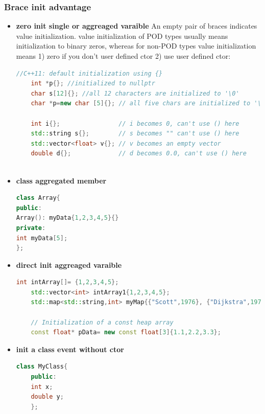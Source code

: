 \documentclass[a4paper,12pt,twoside]{book}
\begin{document}
\subsubsection{Brace init advantage}
\begin{itemize}
	
	\item \textbf{zero init single or aggreaged varaible} An empty pair of braces indicates value initialization. value initialization of POD types usually means initialization to binary zeros, whereas for non-POD types value initialization means 1) zero if you don't user defined ctor 2) use user defined ctor:
	
	\begin{lstlisting}[frame=single, language=c++,mathescape=true]
	//C++11: default initialization using {}
	int *p{}; //initialized to nullptr
	char s[12]{}; //all 12 characters are initialized to '\0'
	char *p=new char [5]{}; // all five chars are initialized to '\0'
	
	int i{};                // i becomes 0, can't use () here
	std::string s{};        // s becomes "" can't use () here
	std::vector<float> v{}; // v becomes an empty vector
	double d{};             // d becomes 0.0, can't use () here
	
	\end{lstlisting}
	
	\item \textbf{class aggregated member}

\begin{lstlisting}[frame=single, language=c++,mathescape=true]
	class Array{
public:
Array(): myData{1,2,3,4,5}{}    
private:
int myData[5];
};
\end{lstlisting}

\item \textbf{direct init aggreaged varaible}
\begin{lstlisting}[frame=single, language=c++,mathescape=true]
	int intArray[]= {1,2,3,4,5};   
	std::vector<int> intArray1{1,2,3,4,5};  
	std::map<std::string,int> myMap{{"Scott",1976}, {"Dijkstra",1972}};
	
	// Initialization of a const heap array
	const float* pData= new const float[3]{1.1,2.2,3.3};
	\end{lstlisting}
	
\item \textbf{ init a class event without ctor}
	\begin{lstlisting}[frame=single, language=c++,mathescape=true]
	class MyClass{			
	public: 
	int x;
	double y;
	};
	

\end{lstlisting}
\end{itemize}
\end{document}
